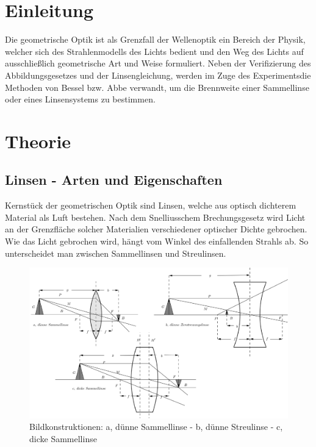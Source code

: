 
\section{Einleitung}
\setcounter{page}{1}
Die geometrische Optik ist als Grenzfall der Wellenoptik ein Bereich der Physik, welcher sich des Strahlenmodells des Lichts bedient und
den Weg des Lichts auf ausschließlich geometrische Art und Weise formuliert. Neben der Verifizierung des Abbildungsgesetzes und der 
Linsengleichung, werden im Zuge des Experimentsdie Methoden von Bessel bzw. Abbe verwandt, um die Brennweite einer Sammellinse oder 
eines Linsensystems zu bestimmen.

\section{Theorie}
\subsection{Linsen - Arten und Eigenschaften}
Kernstück der geometrischen Optik sind Linsen, welche aus optisch dichterem Material als Luft bestehen. Nach dem 
Snelliusschem Brechungsgesetz wird Licht an der Grenzfläche solcher Materialien verschiedener optischer Dichte gebrochen. Wie das Licht
gebrochen wird, hängt vom Winkel des einfallenden Strahls ab. So unterscheidet man zwischen Sammellinsen und Streulinsen. 

\begin{figure}[H]
 \includegraphics[width=\textwidth]{pics/408a.png}
 \centering
 \caption{Bildkonstruktionen: a, dünne Sammellinse - b, dünne Streulinse - c, dicke Sammellinse}
 \label{linsen}
\end{figure}

